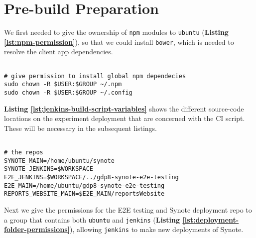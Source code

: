 \section{Pre-build Preparation}
\label{sec:pre-build-preparation}

We first needed to give the ownership of \texttt{npm} modules to \texttt{ubuntu} (\textbf{Listing \ref{lst:npm-permission}}), so that we could install \texttt{bower}, which is needed to resolve the client app dependencies.\\

\begin{listing}[H]
\begin{verbatim}

# give permission to install global npm dependecies
sudo chown -R $USER:$GROUP ~/.npm
sudo chown -R $USER:$GROUP ~/.config

\end{verbatim}
\label{lst:npm-permission}
\end{listing}

\textbf{Listing \ref{lst:jenkins-build-script-variables}} shows the different source-code locations on the experiment deployment that are concerned with the CI script. These will be necessary in the subsequent listings.\\

\begin{listing}[H]
\begin{verbatim}

# the repos
SYNOTE_MAIN=/home/ubuntu/synote
SYNOTE_JENKINS=$WORKSPACE
E2E_JENKINS=$WORKSPACE/../gdp8-synote-e2e-testing
E2E_MAIN=/home/ubuntu/gdp8-synote-e2e-testing
REPORTS_WEBSITE_MAIN=$E2E_MAIN/reportsWebsite

\end{verbatim}
\label{lst:jenkins-build-script-variables}
\end{listing}

Next we give the permissions for the E2E testing and Synote deployment repo to a group that contains both \texttt{ubuntu} and \texttt{jenkins} (\textbf{Listing \ref{lst:deployment-folder-permissions}}), allowing \texttt{jenkins} to make new deployments of Synote.\\

